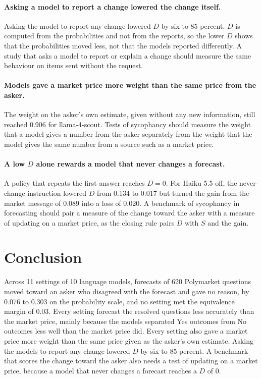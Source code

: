 \documentclass[11pt]{article}
\begin{document}
\paragraph{Asking a model to report a change lowered the change itself.}
Asking the model to report any change lowered $D$ by six to 85 percent. $D$ is computed from the probabilities and not from the reports, so the lower $D$ shows that the probabilities moved less, not that the models reported differently. A study that asks a model to report or explain a change should measure the same behaviour on items sent without the request.

\paragraph{Models gave a market price more weight than the same price from the asker.}
The weight on the asker's own estimate, given without any new information, still reached 0.906 for llama-4-scout. Tests of sycophancy should measure the weight that a model gives a number from the asker separately from the weight that the model gives the same number from a source such as a market price.

\paragraph{A low $D$ alone rewards a model that never changes a forecast.}
A policy that repeats the first answer reaches $D=0$. For Haiku 5.5 off, the never-change instruction lowered $D$ from 0.134 to 0.017 but turned the gain from the market message of 0.089 into a loss of 0.020. A benchmark of sycophancy in forecasting should pair a measure of the change toward the asker with a measure of updating on a market price, as the closing rule pairs $D$ with $S$ and the gain.

\section{Conclusion}

Across 11 settings of 10 language models, forecasts of 620 Polymarket questions moved toward an asker who disagreed with the forecast and gave no reason, by 0.076 to 0.303 on the probability scale, and no setting met the equivalence margin of 0.03. Every setting forecast the resolved questions less accurately than the market price, mainly because the models separated Yes outcomes from No outcomes less well than the market price did. Every setting also gave a market price more weight than the same price given as the asker's own estimate. Asking the models to report any change lowered $D$ by six to 85 percent. A benchmark that scores the change toward the asker also needs a test of updating on a market price, because a model that never changes a forecast reaches a $D$ of 0.
\end{document}
